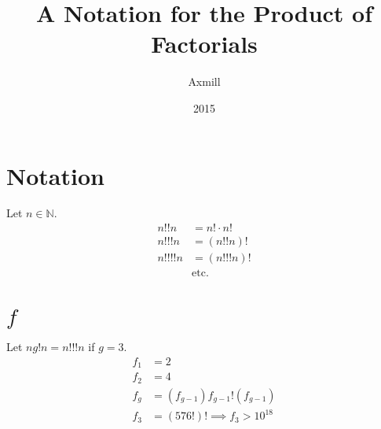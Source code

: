 \documentclass{article}
\title{A Notation for the Product of Factorials}
\author{Axmill}
\date{2015}
\begin{document}
	\maketitle
	\section{Notation}
	Let $n \in \mathbb{N}$.
	\begin{align*}
		n \mathbin{!!} n &= n! \cdot n!\\
		n \mathbin{!!!} n &= (n \mathbin{!!} n)!\\
		n \mathbin{!!!!} n &= (n \mathbin{!!!} n)!\\
		&\mathrm{etc.}
	\end{align*}
	
	\section{$f$}
	Let $n g! n = n \mathbin{!!!} n$ if $g = 3$.
	\begin{align*}
		f_1 &= 2\\
		f_2 &= 4\\
		f_g &= (f_{g - 1}) \mathbin{f_{g - 1}!} (f_{g - 1})\\
		f_3 &= (576!)! \implies f_3 > 10^{18}
	\end{align*}
\end{document}
